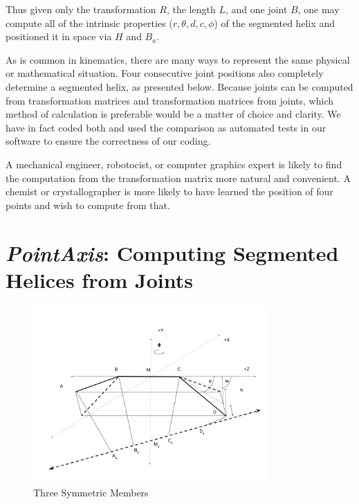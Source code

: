 \documentclass[11pt]{article}
\begin{document}
{Thus given only the transformation $R$, the length $L$, and one
joint $B$, one may compute all of the intrinsic properties
($r,\theta,d,c,\phi$) of
the segmented helix and positioned it in space via $H$ and $B_a$.

As is common in kinematics\cite{funda1990computational}, there are many ways to represent
the same physical or mathematical situation.
Four consecutive joint positions also completely determine a segmented helix, as presented below.
Because joints can be computed from transformation
matrices and transformation matrices from joints,
which method of calculation is preferable would be
a matter of choice and clarity. We have
in fact coded both and used the comparison as automated tests in
our software to ensure
the correctness of our coding.

A mechanical engineer, robotocist, or computer graphics expert is
likely to find the computation from the
transformation matrix more natural and convenient.
A chemist or crystallographer is more likely to
have learned the position of four points and wish to compute from that.

\section{{\em PointAxis}: Computing Segmented Helices from Joints}

\begin{figure}
     \centering
     \includegraphics[width=0.80\textwidth]{figures/TwoAngleDiagram.png}
     \caption{Three Symmetric Members}
  \label{fig:threemembersdiagram}
\end{figure}

}
\end{document}

